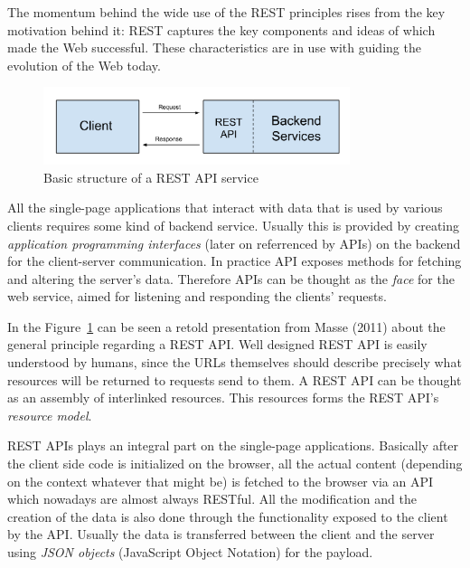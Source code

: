 The momentum behind the wide use of the REST principles rises from the key motivation behind it: REST captures the key components and ideas of which made the Web successful. These characteristics are in use with guiding the evolution of the Web today. \cite{costello_building_2007}

\begin{figure}[t]
\begin{center}
\includegraphics[width=0.8\textwidth]{assets/restapi.png}
\end{center}
\caption{Basic structure of a REST API service}
\label{fig:restapi}
\end{figure}

All the single-page applications that interact with data that is used by various clients requires some kind of backend service. Usually this is provided by creating \textit{application programming interfaces} (later on referrenced by APIs) on the backend for the client-server communication. In practice API exposes methods for fetching and altering the server's data. Therefore APIs can be thought as the \textit{face} for the web service, aimed for listening and responding the clients' requests. \cite{masse_rest_2011}

In the Figure~\ref{fig:restapi} can be seen a retold presentation from Masse (2011) about the general principle regarding a REST API. Well designed REST API is easily understood by humans, since the URLs themselves should describe precisely what resources will be returned to requests send to them. A REST API can be thought as an assembly of interlinked resources. This resources forms the REST API's \textit{resource model}. \cite{masse_rest_2011}

REST APIs plays an integral part on the single-page applications. Basically after the client side code is initialized on the browser, all the actual content (depending on the context whatever that might be) is fetched to the browser via an API which nowadays are almost always RESTful. All the modification and the creation of the data is also done through the functionality exposed to the client by the API. Usually the data is transferred between the client and the server using \textit{JSON objects} (JavaScript Object Notation) for the payload.


